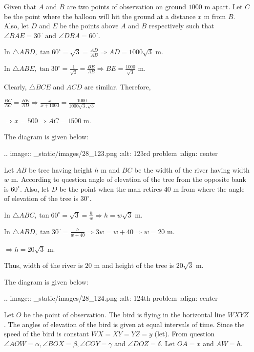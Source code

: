   Given that $A$ and $B$ are two points of observation on ground $1000$ m apart. Let
  $C$ be the point where the balloon will hit the ground at a distance $x$ m from
  $B$. Also, let $D$ and $E$ be the points above $A$ and $B$ respectively
  such that $\angle BAE= 30^\circ$ and $\angle DBA = 60^\circ$.

  In $\triangle ABD, \tan60^\circ = \sqrt{3} = \frac{AD}{AB}\Rightarrow AD = 1000\sqrt{3}$ m.

  In $\triangle ABE, \tan30^\circ = \frac{1}{\sqrt{3}} = \frac{BE}{AB}\Rightarrow BE =
  \frac{1000}{\sqrt{3}}$ m.

  Clearly, $\triangle BCE$ and $ACD$ are similar. Therefore,

  $\frac{BC}{AC} = \frac{BE}{AD} \Rightarrow \frac{x}{x + 1000} =
  \frac{1000}{1000\sqrt{3}.\sqrt{3}}$

  $\Rightarrow x = 500 \Rightarrow AC = 1500$ m.

\item The diagram is given below:

  .. image:: _static/images/28_123.png
  :alt: 123rd problem
  :align: center

  Let $AB$ be tree having height $h$ m and $BC$ be the width of the river having width
  $w$ m. According to question angle of elevation of the tree from the opposite bank is
  $60^\circ$. Also, let $D$ be the point when the man retires $40$ m from where the
  angle of elevation of the tree is $30^\circ$.

  In $\triangle ABC, \tan60^\circ = \sqrt{3} = \frac{h}{w} \Rightarrow h = w\sqrt{3}$ m.

  In $\triangle ABD, \tan30^\circ = \frac{h}{w + 40}\Rightarrow 3w = w + 40 \Rightarrow w = 20$ m.

  $\Rightarrow h = 20\sqrt{3}$ m.

  Thus, width of the river is $20$ m and height of the tree is $20\sqrt{3}$ m.

\item The diagram is given below:

  .. image:: _static/images/28_124.png
  :alt: 124th problem
  :align: center

  Let $O$ be the point of observation. The bird is flying in the horizontal line $WXYZ$. The
  angles of elevation of the bird is given at equal intervals of time. Since the speed of the bird is
  constant $WX = XY = YZ = y$ (let). From question $\angle AOW = \alpha, \angle BOX = \beta,
  \angle COY = \gamma$ and $\angle DOZ = \delta$. Let $OA = x$ and $AW = h$.

